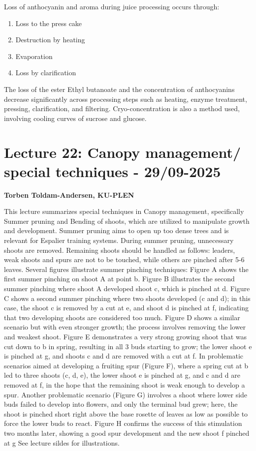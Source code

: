 \vspace{0.5em}
Loss of anthocyanin and aroma during juice processing occurs through: 

\begin{enumerate} 
    \item Loss to the press cake 
    \item Destruction by heating 
    \item Evaporation 
    \item Loss by clarification 
\end{enumerate} 

\vspace{0.5em}
The loss of the ester Ethyl butanoate and the concentration of anthocyanins decrease significantly across processing steps such as heating, enzyme treatment, pressing, clarification, and filtering. Cryo-concentration is also a method used, involving cooling curves of sucrose and glucose.


\section{Lecture 22: Canopy management/ special techniques - 29/09-2025}
\textbf{Torben Toldam-Andersen, KU-PLEN}

\vspace{1em}
This lecture summarizes special techniques in Canopy management, specifically Summer pruning and Bending of shoots, which are utilized to manipulate growth and development. Summer pruning aims to open up too dense trees and is relevant for Espalier training systems. During summer pruning, unnecessary shoots are removed. Remaining shoots should be handled as follows: leaders, weak shoots and spurs are not to be touched, while others are pinched after 5-6 leaves. Several figures illustrate summer pinching techniques: Figure A shows the first summer pinching on shoot A at point b. Figure B illustrates the second summer pinching where shoot A developed shoot c, which is pinched at d. Figure C shows a second summer pinching where two shoots developed (c and d); in this case, the shoot c is removed by a cut at e, and shoot d is pinched at f, indicating that two developing shoots are considered too much. Figure D shows a similar scenario but with even stronger growth; the process involves removing the lower and weakest shoot. Figure E demonstrates a very strong growing shoot that was cut down to b in spring, resulting in all 3 buds starting to grow; the lower shoot e is pinched at g, and shoots c and d are removed with a cut at f. In problematic scenarios aimed at developing a fruiting spur (Figure F), where a spring cut at b led to three shoots (c, d, e), the lower shoot e is pinched at g, and c and d are removed at f, in the hope that the remaining shoot is weak enough to develop a spur. Another problematic scenario (Figure G) involves a shoot where lower side buds failed to develop into flowers, and only the terminal bud grew; here, the shoot is pinched short right above the base rosette of leaves as low as possible to force the lower buds to react. Figure H confirms the success of this stimulation two months later, showing a good spur development and the new shoot f pinched at g
See lecture sildes for illustrations.

